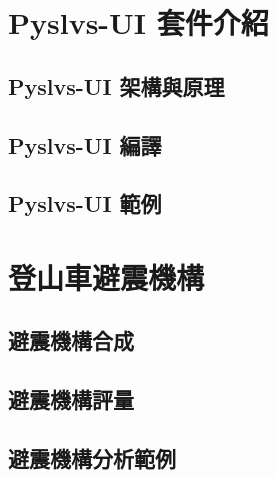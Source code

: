 \documentclass[14pt,a4paper]{report}  %
\begin{document}
        \chapter{Pyslvs-UI 套件介紹}
      \section{Pyslvs-UI 架構與原理}
      \section{Pyslvs-UI 編譯}
      \section{Pyslvs-UI 範例}

        \chapter{登山車避震機構}
      \section{避震機構合成}
      \section{避震機構評量}
      \section{避震機構分析範例}
 
\end{document}
